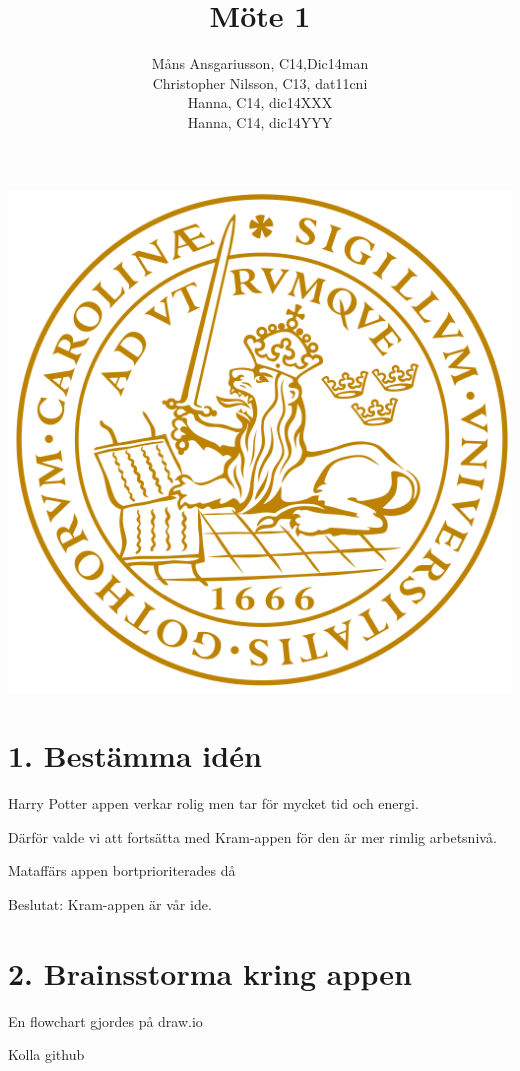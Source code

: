 \documentclass{article}
\begin{document}
\title{Möte 1}
\author{Måns Ansgariusson, C14,Dic14man\\ Christopher Nilsson, C13, dat11cni \\ Hanna, C14, dic14XXX \\ Hanna, C14, dic14YYY }
\maketitle
\centerline{\includegraphics[width=\textwidth]{LTH.png}}
\newpage


\section{1. Bestämma idén }

Harry Potter appen verkar rolig men tar för mycket tid och energi.

Därför valde vi att fortsätta med Kram-appen för den är mer rimlig arbetsnivå.

Mataffärs appen bortprioriterades då 

Beslutat: Kram-appen är vår ide.


\section{2. Brainsstorma kring appen }

En flowchart gjordes på draw.io

Kolla github
\end{document}
